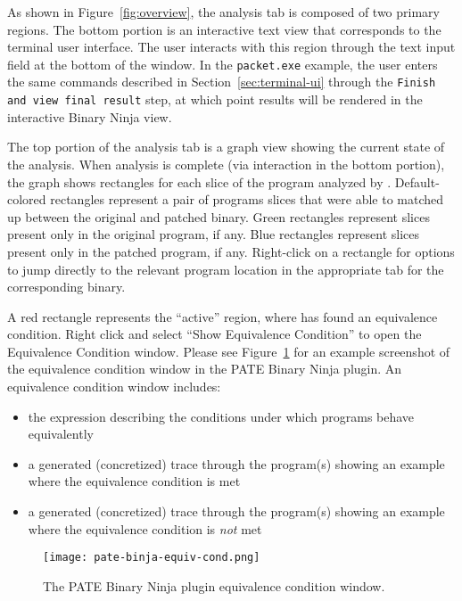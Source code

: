 As shown in Figure~\ref{fig:overview}, the \pate{} analysis tab is composed of two primary regions.
The bottom portion is an interactive text view that corresponds to the terminal user interface.
The user interacts with this region through the text input field at the bottom of the window.
In the \texttt{packet.exe} example, the user enters the same commands described in Section~\ref{sec:terminal-ui} through the \texttt{Finish and view final result} step, at which point results will be rendered in the interactive Binary Ninja view.

The top portion of the \pate{} analysis tab is a graph view showing the current state of the \pate{} analysis.
When \pate{} analysis is complete (via interaction in the bottom portion), the \pate{} graph shows rectangles for each slice of the program analyzed by \pate{}.
Default-colored rectangles represent a pair of programs slices that were able to matched up between the original and patched binary.
Green rectangles represent slices present only in the original program, if any.
Blue rectangles represent slices present only in the patched program, if any.
Right-click on a rectangle for options to jump directly to the relevant program location in the appropriate tab for the corresponding binary.

A red rectangle represents the ``active'' region, where \pate{} has found an equivalence condition.
Right click and select ``Show Equivalence Condition'' to open the Equivalence Condition window.
Please see Figure~\ref{fig:equiv-cond} for an example screenshot of the equivalence condition window in the PATE Binary Ninja plugin.
An equivalence condition window includes:

\begin{itemize}
    \item the expression describing the conditions under which programs behave equivalently
    \item a generated (concretized) trace through the program(s) showing an example where the equivalence condition is met
    \item a generated (concretized) trace through the program(s) showing an example where the equivalence condition is \emph{not} met
\end{itemize}

\begin{figure}[h]
  \centering
  \texttt{[image: pate-binja-equiv-cond.png]}
  \caption{The PATE Binary Ninja plugin equivalence condition window.}
  \label{fig:equiv-cond}
\end{figure}

